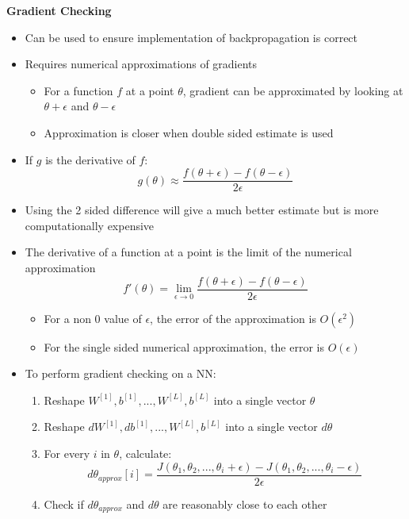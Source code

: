 \documentclass[12pt, letterpaper]{article}
\begin{document}
    \vspace{5mm}
    \textbf{Gradient Checking}
    \begin{itemize}
        \item Can be used to ensure implementation of backpropagation is correct
        \item Requires numerical approximations of gradients
        \begin{itemize}
            \item For a function $f$ at a point $\theta$, gradient can be approximated by looking at $\theta+\epsilon$ and $\theta-\epsilon$
            \item Approximation is closer when double sided estimate is used
        \end{itemize}
        \item If $g$ is the derivative of $f$:
        $$g(\theta)\approx\frac{f(\theta+\epsilon)-f(\theta-\epsilon)}{2\epsilon}$$
        \item Using the 2 sided difference will give a much better estimate but is more computationally expensive
        \item The derivative of a function at a point is the limit of the numerical approximation
        $$f'(\theta)=\lim_{\epsilon\rightarrow 0}\frac{f(\theta+\epsilon)-f(\theta-\epsilon)}{2\epsilon}$$
        \begin{itemize}
            \item For a non 0 value of $\epsilon$, the error of the approximation is $O(\epsilon^2)$
            \item For the single sided numerical approximation, the error is $O(\epsilon)$ 
        \end{itemize}
        \item To perform gradient checking on a NN:
        \begin{enumerate}
            \item Reshape $W^{[1]},b^{[1]},...,W^{[L]},b^{[L]}$ into a single vector $\theta$
            \item Reshape $dW^{[1]},db^{[1]},...,W^{[L]},b^{[L]}$ into a single vector $d\theta$
            \item For every $i$ in $\theta$, calculate:
            $$d\theta_{approx}[i]=\frac{J(\theta_1,\theta_2,...,\theta_i+\epsilon)-J(\theta_1,\theta_2,...,\theta_i-\epsilon)}{2\epsilon}$$
            \item Check if $d\theta_{approx}$ and $d\theta$ are reasonably close to each other
            

\end{enumerate}
\end{itemize}
\end{document}
